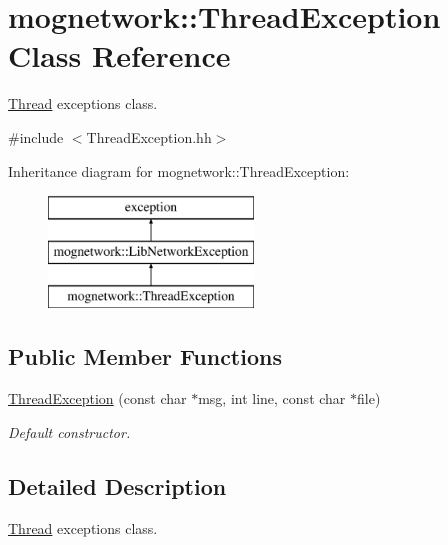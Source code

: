 \hypertarget{classmognetwork_1_1_thread_exception}{\section{mognetwork\-:\-:Thread\-Exception Class Reference}
\label{classmognetwork_1_1_thread_exception}
}


\hyperlink{classmognetwork_1_1_thread}{Thread} exceptions class.  




{\ttfamily \#include $<$Thread\-Exception.\-hh$>$}

Inheritance diagram for mognetwork\-:\-:Thread\-Exception\-:\begin{figure}[H]
\begin{center}
\leavevmode
\includegraphics[height=3.000000cm]{classmognetwork_1_1_thread_exception}
\end{center}
\end{figure}
\subsection*{Public Member Functions}
\begin{DoxyCompactItemize}
\item 
\hyperlink{classmognetwork_1_1_thread_exception_a0f8e6b5811c083a0a656e9075fb53674}{Thread\-Exception} (const char $\ast$msg, int line, const char $\ast$file)
\begin{DoxyCompactList}\small\item\em Default constructor. \end{DoxyCompactList}\end{DoxyCompactItemize}


\subsection{Detailed Description}
\hyperlink{classmognetwork_1_1_thread}{Thread} exceptions class. 

